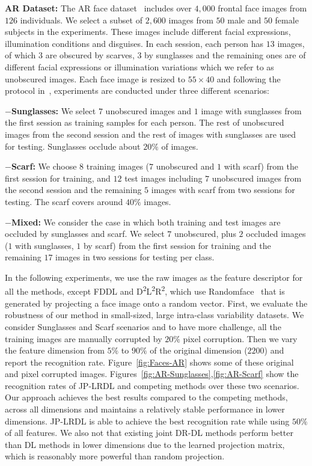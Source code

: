 \documentclass[journal]{IEEEtran}
\begin{document}
\vspace{1em}
\textbf{AR Dataset:} The AR face dataset~\cite{AR} includes over $4,000$ frontal face images from $126$ individuals. We select a subset of $2,600$ images from $50$ male and $50$ female subjects in the experiments. These images include different facial expressions, illumination conditions and disguises. In each session, each person has $13$ images, of which $3$ are obscured by scarves, $3$ by sunglasses and the remaining ones are of different facial expressions or illumination variations which we refer to as unobscured images. Each face image is resized to $55 \times 40$ and following the protocol in~\cite{Structured-LR-DL}, experiments are conducted under three different scenarios:

$-$\textbf{Sunglasses:} We select $7$ unobscured images and $1$ image with sunglasses from the first session as training samples for each person. The rest of unobscured images from the second session and the rest of images with sunglasses are used for testing. Sunglasses occlude about $20\%$ of images.

$-$\textbf{Scarf:} We choose $8$ training images ($7$ unobscured and $1$ with scarf) from the first session for training, and $12$ test images including $7$ unobscured images from the second session and the remaining $5$ images with scarf from two sessions for testing. The scarf covers around $40\%$ images.

$-$\textbf{Mixed:} We consider the case in which both training and test images are occluded by sunglasses and scarf. We select $7$ unobscured, plus $2$ occluded images ($1$ with sunglasses, $1$ by scarf) from the first session for training and the remaining $17$ images in two sessions for testing per class.

In the following experiments, we use the raw images as the feature descriptor for all the methods, except FDDL and D\textsuperscript{2}L\textsuperscript{2}R\textsuperscript{2}, which use Randomface~\cite{LC-KSVD} that is generated by projecting a face image onto a random vector. 
First, we evaluate the robustness of our method in small-sized, large intra-class variability datasets. We consider Sunglasses and Scarf scenarios and to have more challenge, all the training images are manually corrupted by $20\%$ pixel corruption. Then we vary the feature dimension from $5\%$ to $90\%$ of the original dimension ($2200$) and report the recognition rate. Figure~\ref{fig:Faces-AR} shows some of these original and pixel corrupted images. Figures~\ref{fig:AR-Sunglasses},\ref{fig:AR-Scarf} show the recognition rates of JP-LRDL and competing methods over these two scenarios. Our approach achieves the best results compared to the competing methods, across all dimensions and maintains a relatively stable performance in lower dimensions. JP-LRDL is able to achieve the best recognition rate while using $50\%$ of all features. We also not that existing joint DR-DL methods perform better than DL methods in lower dimensions due to the learned projection matrix, which is reasonably more powerful than random projection. 
\end{document}
